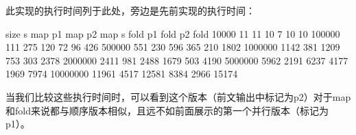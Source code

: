 此实现的执行时间列于此处，旁边是先前实现的执行时间：

\begin{shell}
    size   s map p1 map  p2 map  s fold p1 fold p2 fold
   10000      11     11      10       7      10      10
  100000     111    275     120      72      96     426
  500000     551    230     596     365     210    1802
 1000000    1142    381    1209     753     303    2378
 2000000    2411    981    2488    1679     503    4190
 5000000    5962   2191    6237    4177    1969    7974
10000000   11961   4517   12581    8384    2966   15174
\end{shell}

当我们比较这些执行时间时，可以看到这个版本（前文输出中标记为p2）对于map和fold来说都与顺序版本相似，且远不如前面展示的第一个并行版本（标记为p1）。



